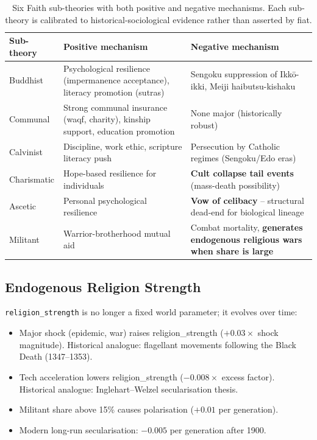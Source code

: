 \begin{table}[ht]
\centering
\small
\begin{tabularx}{\linewidth}{lXX}
\toprule
\textbf{Sub-theory} & \textbf{Positive mechanism} & \textbf{Negative mechanism} \\
\midrule
Buddhist & Psychological resilience (impermanence acceptance), literacy promotion (sutras) & Sengoku suppression of Ikkō-ikki, Meiji haibutsu-kishaku \\
Communal & Strong communal insurance (waqf, charity), kinship support, education promotion & None major (historically robust) \\
Calvinist & Discipline, work ethic, scripture literacy push & Persecution by Catholic regimes (Sengoku/Edo eras) \\
Charismatic & Hope-based resilience for individuals & \textbf{Cult collapse tail events} (mass-death possibility) \\
Ascetic & Personal psychological resilience & \textbf{Vow of celibacy} -- structural dead-end for biological lineage \\
Militant & Warrior-brotherhood mutual aid & Combat mortality, \textbf{generates endogenous religious wars when share is large} \\
\bottomrule
\end{tabularx}
\caption[Faith sub-theories with both effects]{Six Faith sub-theories with
both positive and negative mechanisms. Each sub-theory is calibrated to
historical-sociological evidence rather than asserted by fiat.}
\label{tab:vision-faith-sides}
\end{table}

\subsection{Endogenous Religion Strength}
\label{sec:vision-religion-endogenous}

\texttt{religion\_strength} is no longer a fixed world parameter; it
evolves over time:

\begin{itemize}
\item Major shock (epidemic, war) raises religion\_strength
($+0.03 \times$ shock magnitude). Historical analogue: flagellant
movements following the Black Death (1347--1353).
\item Tech acceleration lowers religion\_strength
($-0.008 \times$ excess factor). Historical analogue: Inglehart--Welzel
secularisation thesis.
\item Militant share above 15\% causes polarisation
($+0.01$ per generation).
\item Modern long-run secularisation: $-0.005$ per generation after
1900.
\end{itemize}

